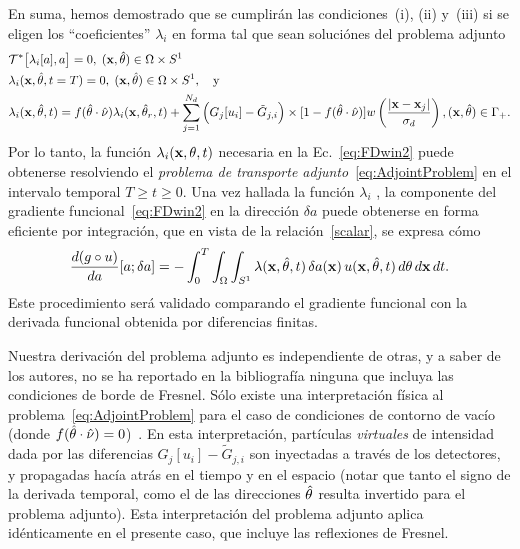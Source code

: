 En suma, hemos 
demostrado que se cumplirán las condiciones~(i), (ii) y~(iii) si se eligen 
los ``coeficientes'' $\lambda_i$ en forma tal que sean soluciónes 
del problema adjunto
\begin{equation}
\begin{split}
\begin{aligned}
  &\mathcal{T}^*\big[\lambda_i[a],a\big]=0, \; (\mathbf{x},\hat{\theta})
  \in \Omega\times S^1\\
  &\lambda_i(\mathbf{x},\hat{\theta},t=T)=0,\; (\mathbf{x},\hat{\theta})
  \in \Omega\times S^1,\quad\mbox{y}\\
  &\lambda_i(\mathbf{x},\hat{\theta},t) = f(\hat{\theta} \cdot \hat{\nu})
  \lambda_i(\mathbf{x},\hat{\theta}_r,t)+\sum_{j=1}^{N_d} \Big( G_j[u_i] 
  -\tilde {G}_{j,i} \Big) \times [1-f(\hat{\theta} \cdot \hat{\nu})] w\left( \frac{
      |\mathbf{x}-\mathbf{x}_j |}{\sigma_d} \right), (\mathbf{x},\hat{\theta}) \in \Gamma_+.
\end{aligned}
\end{split}
\label{eq:AdjointProblem}
\end{equation}
Por lo tanto, la función $\lambda_i(\mathbf{x},\theta,t)$ necesaria en la 
Ec.~\eqref{eq:FDwin2} puede obtenerse resolviendo el \textit{problema 
de transporte adjunto}~\eqref{eq:AdjointProblem} en el intervalo 
temporal  $T \geq t \geq 0$. Una vez hallada la función $\lambda_i$ , 
la componente del gradiente funcional~\eqref{eq:FDwin2} en la 
dirección $\delta a$ puede obtenerse en forma 
eficiente por integración, que en vista de la relación~\eqref{scalar}, 
se expresa cómo
\begin{equation}\label{gradient_fin}
  \frac{d (g \circ u)}{da}[a;\delta a] =-\int_0^T \int_{\Omega} \int_{S^1} \lambda(\mathbf{x},\hat{\theta},t) \, \delta
  a(\mathbf{x}) \, u(\mathbf{x},\hat{\theta},t) \, d \theta \, d\mathbf{x} \, dt.
\end{equation}
Este procedimiento será validado comparando 
el gradiente funcional con la derivada funcional obtenida por diferencias finitas. 

Nuestra derivación del problema adjunto es independiente de otras, 
y a saber de los autores, no se ha reportado en la bibliografía ninguna que incluya las condiciones de borde de Fresnel.  
Sólo existe una interpretación física al 
problema~\eqref{eq:AdjointProblem} para el caso de condiciones 
de contorno de vacío (donde $f(\hat{\theta} \cdot \hat{\nu})=0$)~\cite{Dorn,Dorn2000}. 
En esta interpretación, partículas \textit{virtuales} 
de intensidad dada por las diferencias $G_j[u_i]-\tilde {G}_{j,i}$ 
son inyectadas a través de los detectores, y propagadas hacía atrás en el tiempo 
y en el espacio (notar que tanto el signo de la derivada temporal, 
como el de las direcciones $\hat{\theta}$ resulta invertido para el problema adjunto). 
Esta interpretación del problema adjunto aplica idénticamente 
en el presente caso, que incluye las reflexiones de Fresnel. 

